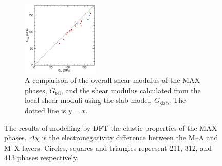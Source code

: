\begin{figure}
\begin{subfigure}{\textwidth}
\centering
{}
\includegraphics[width=0.4\textwidth]{Gslab_vs_Grel}
\caption{A comparison of the overall shear modulus of the MAX phases, $G_{\text{rel}}$, and the shear modulus calculated from the local shear moduli using the slab model, $G_{\text{slab}}$. The dotted line is $y=x$. \label{fig:Gslab_vs_Grel}}
\end{subfigure}

\caption[The local elastic properties of the MAX phases.]{The results of modelling by DFT the elastic properties of the MAX phases. $\Delta \chi$ is the electronegativity difference between the M--A and M--X layers. Circles, squares and triangles represent 211, 312, and 413 phases respectively.}

\end{figure}

